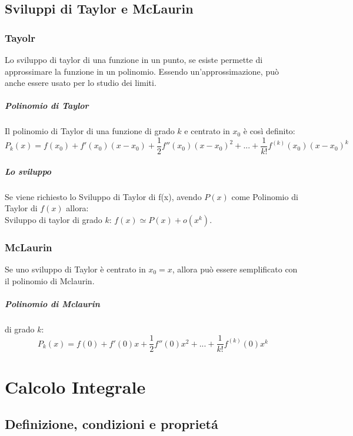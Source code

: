 \documentclass[12pt, a4paper, openany]{book}
\begin{document}
\section{Sviluppi di Taylor e McLaurin}

\subsection{Tayolr}
Lo sviluppo di taylor di una funzione in un punto, se esiste permette di approssimare la funzione in un polinomio.
Essendo un'approssimazione, può anche essere usato per lo studio dei limiti.


\paragraph{Polinomio di Taylor} Il polinomio di Taylor di una funzione di grado $k$ e centrato in $x_0$ è così definito:
$$P_k(x)=f(x_0)+f'(x_0)(x-x_0) + \frac{1}{2}f''(x_0)(x-x_0)^2 +... + \frac{1}{k!}f^{(k)}(x_0)(x-x_0)^k$$

\paragraph*{Lo sviluppo} Se viene richiesto lo Sviluppo di Taylor di f(x), avendo $P(x)$ come Polinomio di Taylor di $f(x)$ allora:
\\Sviluppo di taylor di grado $k$: $f(x) \simeq P(x) + o(x^k)$.

\subsection{McLaurin}
Se uno sviluppo di Taylor è centrato in $x_0=x$, allora può essere semplificato con il polinomio di Mclaurin.
\paragraph*{Polinomio di Mclaurin} di grado $k$:
$$P_k(x)=f(0)+f'(0)x+\frac{1}{2}f''(0)x^2+...+\frac{1}{k!}f^{(k)}(0)x^k$$




\chapter{Calcolo Integrale}

\section{Definizione, condizioni e proprietá}
\end{document}

